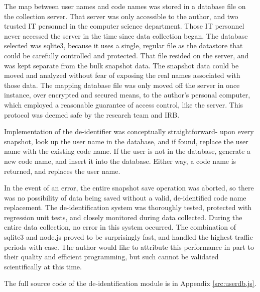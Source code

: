The map between user names and code names was stored in a database file on the collection server. That server was only accessible to the author, and two trusted IT personnel in the computer science department. Those IT personnel never accessed the server in the time since data collection began. The database selected was sqlite3, because it uses a single, regular file as the datastore that could be carefully controlled and protected. That file resided on the server, and was kept separate from the bulk snapshot data. The snapshot data could be moved and analyzed without fear of exposing the real names associated with those data. The mapping database file was only moved off the server in once instance, over encrypted and secured means, to the author's personal computer, which employed a reasonable guarantee of access control, like the server. This protocol was deemed safe by the research team and IRB.

Implementation of the de-identifier was conceptually straightforward- upon every snapshot, look up the user name in the database, and if found, replace the user name with the existing code name. If the user is not in the database, generate a new code name, and insert it into the database. Either way, a code name is returned, and replaces the user name. 

In the event of an error, the entire snapshot save operation was aborted, so there was no possibility of data being saved without a valid, de-identified code name replacement. The de-identification system was thoroughly tested, protected with regression unit tests, and closely monitored during data collected. During the entire data collection, no error in this system occurred. The combination of sqlite3 and node.js proved to be surprisingly fast, and handled the highest traffic periods with ease. The author would like to attribute this performance in part to their quality and efficient programming, but such cannot be validated scientifically at this time.

The full source code of the de-identification module is in Appendix \ref{src:userdb.js}.

